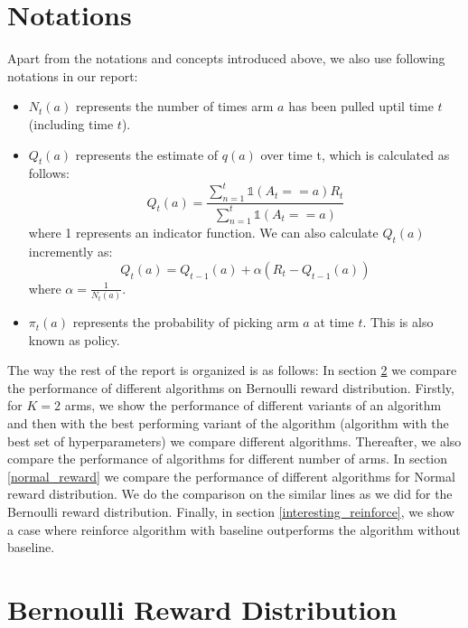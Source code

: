 \documentclass{article}
\begin{document}
\section{Notations}
	Apart from the notations and concepts introduced above, we also use following notations in our report:
	\begin{itemize}
		\item $N_{t}(a)$ represents the number of times arm $a$ has been pulled uptil time $t$ (including time $t$).
		
		\item $Q_{t}(a)$ represents the estimate of $q(a)$ over time t, which is calculated as follows:
				\begin{equation}
				\nonumber
					Q_{t}(a) = \frac{\sum_{n=1}^{t} \mathbb{1}(A_{t} == a) R_{t}}{\sum_{n=1}^{t} \mathbb{1}(A_{t} == a)}
				\end{equation}
				where 1 represents an indicator function. We can also calculate $Q_{t}(a)$ incremently as:
				\begin{equation}
				\nonumber
					Q_{t}(a) = Q_{t-1}(a) + \alpha (R_{t} - Q_{t-1}(a))
				\end{equation}
				where $\alpha = \frac{1}{N_{t}(a)}$.
				
		\item $\pi_{t}(a)$ represents the probability of picking arm $a$ at time $t$. This is also known as policy.
	\end{itemize}
	
	The way the rest of the report is organized is as follows: In section \ref{bernoulli_reward} we compare the performance of different algorithms on Bernoulli
	reward distribution. Firstly, for $K=2$ arms, we show the performance of different variants of an algorithm and then with the best performing variant of the
	algorithm (algorithm with the best set of hyperparameters) we compare different algorithms. Thereafter, we also compare the performance of algorithms for 
	different number of arms. In section \ref{normal_reward} we compare the performance of different algorithms for Normal reward distribution. We do the comparison
	on the similar lines as we did for the Bernoulli reward distribution. Finally, in section \ref{interesting_reinforce}, we show a case where reinforce algorithm
	with baseline outperforms the algorithm without baseline.

\section{Bernoulli Reward Distribution}
	\label{bernoulli_reward}
\end{document}
